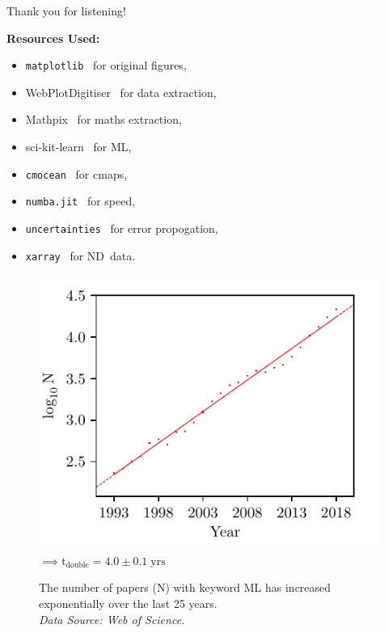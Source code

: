 \begin{frame}{Thank you for listening!}
      \begin{minipage}{1.1\textwidth}
   \hspace{-20pt}\begin{minipage}{0.45\textwidth}
   \textbf{Resources Used:}
   \begin{itemize}
\item \texttt{matplotlib}~\cite{Hunter:2007} for original figures,
\item WebPlotDigitiser~\cite{WebPlotDigitiser} for data extraction,
\item Mathpix~\cite{mathpix} for maths extraction,
\item sci-kit-learn~\cite{scikit-learn}  for ML,
\item \texttt{cmocean}~\cite{thyng2016true}
for cmaps,
\item \texttt{numba.jit}~\cite{lam2015numba} for speed,
\item \texttt{uncertainties}~\cite{lebigot2010uncertainties} for error propogation,
\item \texttt{xarray}~\cite{hoyer2017xarray} for ND~data.
\end{itemize}
    \end{minipage}\hspace{10pt}
      \begin{minipage}{0.50\textwidth}
    \begin{figure}
            \includegraphics[width=1\linewidth]{images/example-images/Compared_O2.pdf}
            \normalsize{
    $\implies \mathrm{t}_{\mathrm{double}}=4.0\pm0.1\;\mathrm{yrs}$}
                \caption{The number of papers ($\mathrm{N}$) with keyword ML
                 has increased exponentially over the last 25 years.\\ \textit{
                   Data Source: Web of Science.} %
                   }
    \end{figure}
    \end{minipage}
\end{minipage}
\end{frame}
